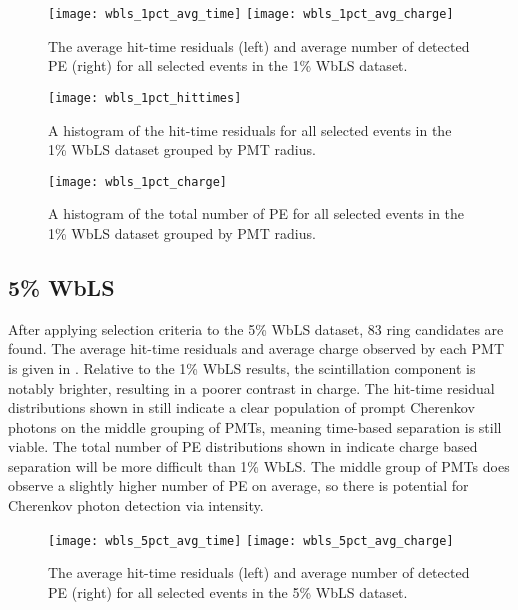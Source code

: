 \begin{figure}
\centering
\texttt{[image: wbls\_1pct\_avg\_time]}
\hfill
\texttt{[image: wbls\_1pct\_avg\_charge]}
\caption{\label{fig:wbls1pct_avg}The average hit-time residuals (left) and average number of detected PE (right) for all selected events in the 1\% WbLS dataset.}
\end{figure}

\begin{figure}
\centering
\texttt{[image: wbls\_1pct\_hittimes]}
\caption{\label{fig:wbls1pct_tresid}A histogram of the hit-time residuals for all selected events in the 1\% WbLS dataset grouped by PMT radius.}
\end{figure}

\begin{figure}
\centering
\texttt{[image: wbls\_1pct\_charge]}
\caption{\label{fig:wbls1pct_totalq}A histogram of the total number of PE for all selected events in the 1\% WbLS dataset grouped by PMT radius.}
\end{figure}

\clearpage

\subsection{5\% WbLS}

After applying selection criteria to the 5\% WbLS dataset, 83 ring candidates are found.
The average hit-time residuals and average charge observed by each PMT is given in .
Relative to the 1\% WbLS results, the scintillation component is notably brighter, resulting in a poorer contrast in charge.
The hit-time residual distributions shown in  still indicate a clear population of prompt Cherenkov photons on the middle grouping of PMTs, meaning time-based separation is still viable.
The total number of PE distributions shown in  indicate charge based separation will be more difficult than 1\% WbLS.
The middle group of PMTs does observe a slightly higher number of PE on average, so there is potential for Cherenkov photon detection via intensity.

\begin{figure}
\centering
\texttt{[image: wbls\_5pct\_avg\_time]}
\hfill
\texttt{[image: wbls\_5pct\_avg\_charge]}
\caption{\label{fig:wbls5pct_avg}The average hit-time residuals (left) and average number of detected PE (right) for all selected events in the 5\% WbLS dataset.}
\end{figure}

